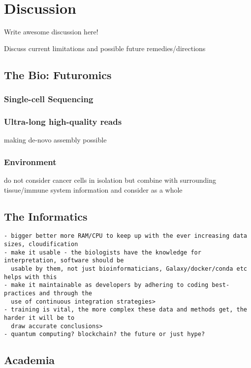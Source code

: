 \chapter{Discussion}
\label{discussion}
\setcounter{figure}{-1}
\setcounter{table}{-1}
\setcounter{section}{-1}
\setcounter{NAT@ctr}{-1}

Write awesome discussion here!

Discuss current limitations and possible future remedies/directions

\section{The Bio: Futuromics}

\subsection{Single-cell Sequencing}

\subsection{Ultra-long high-quality reads}
making de-novo assembly possible

\subsection{Environment}
do not consider cancer cells in isolation but combine with surrounding tissue/immune system information and consider as a whole


\section{The Informatics}
\begin{verbatim}
- bigger better more RAM/CPU to keep up with the ever increasing data sizes, cloudification
- make it usable - the biologists have the knowledge for interpretation, software should be
  usable by them, not just bioinformaticians, Galaxy/docker/conda etc helps with this
- make it maintainable as developers by adhering to coding best-practices and through the
  use of continuous integration strategies>
- training is vital, the more complex these data and methods get, the harder it will be to
  draw accurate conclusions>
- quantum computing? blockchain? the future or just hype?
\end{verbatim}

\section{Academia}

